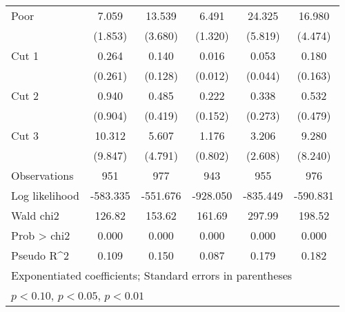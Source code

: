 \begin{table}[htbp]
\begin{tabular}{l*{5}{c}}
Poor                &       7.059\sym{***}&      13.539\sym{***}&       6.491\sym{***}&      24.325\sym{***}&      16.980\sym{***}\\
                    &     (1.853)         &     (3.680)         &     (1.320)         &     (5.819)         &     (4.474)         \\
Cut 1               &       0.264         &       0.140\sym{**} &       0.016\sym{***}&       0.053\sym{***}&       0.180\sym{*}  \\
                    &     (0.261)         &     (0.128)         &     (0.012)         &     (0.044)         &     (0.163)         \\
Cut 2               &       0.940         &       0.485         &       0.222\sym{**} &       0.338         &       0.532         \\
                    &     (0.904)         &     (0.419)         &     (0.152)         &     (0.273)         &     (0.479)         \\
Cut 3               &      10.312\sym{**} &       5.607\sym{**} &       1.176         &       3.206         &       9.280\sym{**} \\
                    &     (9.847)         &     (4.791)         &     (0.802)         &     (2.608)         &     (8.240)         \\
\hline
Observations        &         951         &         977         &         943         &         955         &         976         \\
Log likelihood      &    -583.335         &    -551.676         &    -928.050         &    -835.449         &    -590.831         \\
Wald chi2           &      126.82         &      153.62         &      161.69         &      297.99         &      198.52         \\
Prob > chi2         &       0.000         &       0.000         &       0.000         &       0.000         &       0.000         \\
Pseudo R^2          &       0.109         &       0.150         &       0.087         &       0.179         &       0.182         \\
\hline\hline
\multicolumn{6}{l}{\footnotesize Exponentiated coefficients; Standard errors in parentheses}\\
\multicolumn{6}{l}{\footnotesize \sym{*} \(p<0.10\), \sym{**} \(p<0.05\), \sym{***} \(p<0.01\)}\\
\end{tabular}
\end{table}
